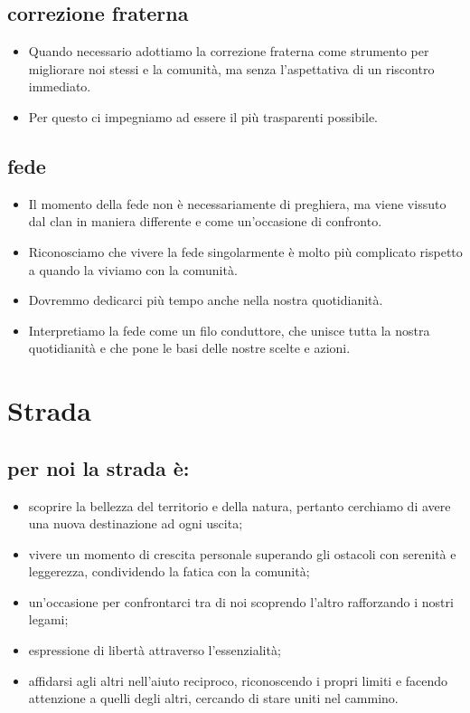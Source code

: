 \documentclass[12pt]{report}
\begin{document}
		\section*{correzione fraterna}
		\begin{itemize}
			\item Quando necessario adottiamo la correzione fraterna come 
			strumento per migliorare noi stessi e la comunità, 
			ma senza l'aspettativa di un riscontro immediato.
			\item Per questo ci impegniamo ad essere il più trasparenti
			possibile.
		\end{itemize}
		
		\section*{fede}
		\begin{itemize}
			\item Il momento della fede non è necessariamente di preghiera,
			ma viene vissuto dal clan in maniera differente e come un’occasione 
			di confronto.
			\item Riconosciamo  che vivere la fede singolarmente è molto più 
			complicato rispetto a quando la viviamo con la comunità. 
			\item Dovremmo dedicarci più tempo anche nella nostra quotidianità.
			\item Interpretiamo la fede come un filo conduttore, 
			che unisce tutta la nostra quotidianità e che pone le basi delle 
			nostre scelte e azioni.
		\end{itemize}
	
	\chapter*{Strada}
		
		\section*{per noi la strada è:}
		\begin{itemize}
			\item scoprire la bellezza del territorio e della natura, 
			pertanto cerchiamo di avere una nuova destinazione ad ogni uscita;
			\item vivere un momento di crescita personale superando gli 
			ostacoli con serenità e leggerezza, condividendo la fatica con la 
			comunità;
			\item un’occasione per confrontarci tra di noi scoprendo l'altro 
			rafforzando i nostri legami;
			\item espressione di libertà attraverso l'essenzialità;
			\item affidarsi agli altri nell'aiuto reciproco, riconoscendo i 
			propri limiti e facendo attenzione a quelli degli altri, cercando 
			di stare uniti nel cammino.
		\end{itemize}
		
\end{document}
